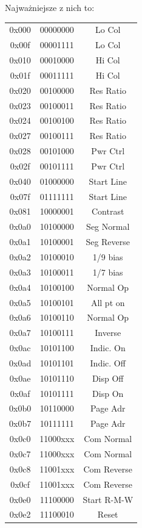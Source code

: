 \documentclass{classrep}
\begin{document}
Najważniejsze z nich to:\\

\begin{center}
\begin{longtable}{ c c c }
0x000 & 00000000 & Lo Col \\
0x00f & 00001111 & Lo Col \\
0x010 & 00010000 & Hi Col \\
0x01f & 00011111 & Hi Col \\
0x020 & 00100000 & Res Ratio \\
0x023 & 00100011 & Res Ratio \\
0x024 & 00100100 & Res Ratio \\
0x027 & 00100111 & Res Ratio \\
0x028 & 00101000 & Pwr Ctrl \\
0x02f & 00101111 & Pwr Ctrl \\
0x040 & 01000000 & Start Line \\
0x07f & 01111111 & Start Line \\
0x081 & 10000001 & Contrast \\
0x0a0 & 10100000 & Seg Normal \\
0x0a1 & 10100001 & Seg Reverse \\
0x0a2 & 10100010 & 1/9 bias \\
0x0a3 & 10100011 & 1/7 bias \\
0x0a4 & 10100100 & Normal Op \\
0x0a5 & 10100101 & All pt on \\
0x0a6 & 10100110 & Normal Op \\
0x0a7 & 10100111 & Inverse \\
0x0ac & 10101100 & Indic. On \\
0x0ad & 10101101 & Indic. Off \\
0x0ae & 10101110 & Disp Off \\
0x0af & 10101111 & Disp On \\
0x0b0 & 10110000 & Page Adr \\
0x0b7 & 10111111 & Page Adr \\
0x0c0 & 11000xxx & Com Normal \\
0x0c7 & 11000xxx & Com Normal \\
0x0c8 & 11001xxx & Com Reverse \\
0x0cf & 11001xxx & Com Reverse \\
0x0e0 & 11100000 & Start R-M-W \\
0x0e2 & 11100010 & Reset
\end{longtable}
\end{center}
\end{document}
